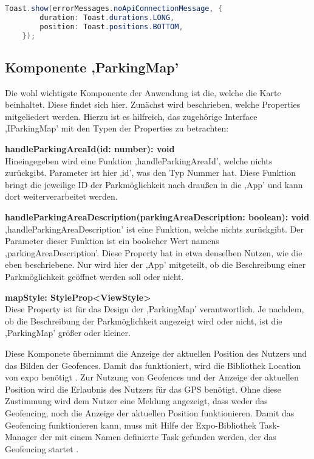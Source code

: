 \begin{lstlisting}[caption={Ein Beispiel des Aufrufs eines Toasts aus der Datei DbConnectionService. (Quelle: Eigene Implementierung)},captionpos=b, language=Java, label=lst:toast]
	Toast.show(errorMessages.noApiConnectionMessage, {
		duration: Toast.durations.LONG,
		position: Toast.positions.BOTTOM,
	});
\end{lstlisting}

\subsection{Komponente ,ParkingMap'}
Die wohl wichtigste Komponente der Anwendung ist die, welche die Karte beinhaltet. Diese findet sich hier. Zunächst wird beschrieben, welche Properties mitgeliedert werden. Hierzu ist es hilfreich, das zugehörige Interface ,IParkingMap' mit den Typen der Properties zu betrachten:
\begin{description}
	\item \textbf{handleParkingAreaId(id: number): void} \\ Hineingegeben wird eine Funktion ,handleParkingAreaId', welche nichts zurückgibt. Parameter ist hier ,id', was den Typ Nummer hat. Diese Funktion bringt die jeweilige ID der Parkmöglichkeit nach draußen in die ,App' und kann dort weiterverarbeitet werden.
	\item \textbf{handleParkingAreaDescription(parkingAreaDescription: boolean): void} \\ ,handleParkingAreaDescription' ist eine Funktion, welche nichts zurückgibt. Der Parameter dieser Funktion ist ein boolscher Wert namens ,parkingAreaDescription'. Diese Property hat in etwa denselben Nutzen, wie die eben beschriebene. Nur wird hier der ,App' mitgeteilt, ob die Beschreibung einer Parkmöglichkeit geöffnet werden soll oder nicht.
	\item \textbf{mapStyle: StyleProp<ViewStyle>} \\ Diese Property ist für das Design der ,ParkingMap' verantwortlich. Je nachdem, ob die Beschreibung der Parkmöglichkeit angezeigt wird oder nicht, ist die ,ParkingMap' größer oder kleiner.
\end{description}

Diese Komponete übernimmt die Anzeige der aktuellen Position des Nutzers und das Bilden der Geofences. Damit das funktioniert, wird die Bibliothek Location von expo benötigt \cite{expoLocation}. Zur Nutzung von Geofences und der Anzeige der aktuellen Position wird die Erlaubnis des Nutzers für das GPS benötigt. Ohne diese Zustimmung wird dem Nutzer eine Meldung angezeigt, dass weder das Geofencing, noch die Anzeige der aktuellen Position funktionieren. Damit das Geofencing funktionieren kann, muss mit Hilfe der Expo-Bibliothek Task-Manager der mit einem Namen definierte Task gefunden werden, der das Geofencing startet \cite{taskmanager}.

